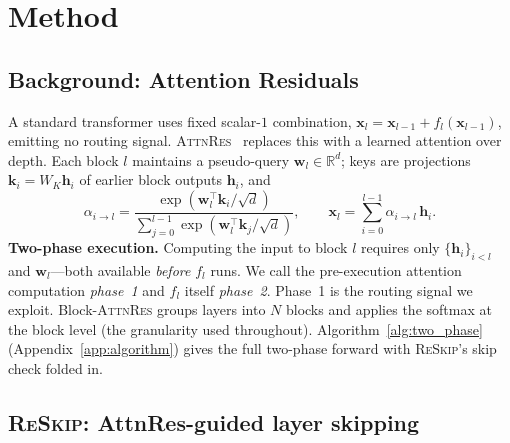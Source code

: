 \documentclass{article}
\newcommand{\attnres}{\textsc{AttnRes}}
\newcommand{\reskip}{\textsc{ReSkip}}
\newcommand{\R}{\mathbb{R}}
\begin{document}
\section{Method}
\label{sec:method}

\subsection{Background: Attention Residuals}
\label{sec:background}

A standard transformer uses fixed scalar-$1$ combination, $\mathbf{x}_l = \mathbf{x}_{l-1} + f_l(\mathbf{x}_{l-1})$, emitting no routing signal. \attnres{}~\citep{chen2026attnres} replaces this with a learned attention over depth. Each block $l$ maintains a pseudo-query $\mathbf{w}_l \in \R^d$; keys are projections $\mathbf{k}_i = W_K \mathbf{h}_i$ of earlier block outputs $\mathbf{h}_i$, and
\begin{equation}
  \alpha_{i \to l} = \frac{\exp(\mathbf{w}_l^\top \mathbf{k}_i / \sqrt{d})}{\sum_{j=0}^{l-1} \exp(\mathbf{w}_l^\top \mathbf{k}_j / \sqrt{d})},
  \qquad
  \mathbf{x}_l = \sum_{i=0}^{l-1} \alpha_{i \to l}\,\mathbf{h}_i .
  \label{eq:attnres}
\end{equation}
\textbf{Two-phase execution.} Computing the input to block $l$ requires only $\{\mathbf{h}_i\}_{i<l}$ and $\mathbf{w}_l$---both available \emph{before} $f_l$ runs. We call the pre-execution attention computation \emph{phase~1} and $f_l$ itself \emph{phase~2}. Phase~1 is the routing signal we exploit. Block-\attnres{} groups layers into $N$ blocks and applies the softmax at the block level (the granularity used throughout). Algorithm~\ref{alg:two_phase} (Appendix~\ref{app:algorithm}) gives the full two-phase forward with \reskip{}'s skip check folded in.

\subsection{\reskip{}: AttnRes-guided layer skipping}
\label{sec:reskip}
\end{document}
